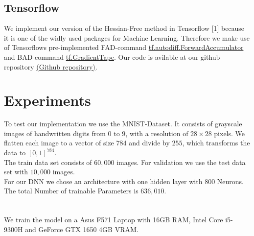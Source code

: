 \documentclass[conference]{IEEEtran}
\begin{document}
\subsection{Tensorflow}
\noindent
We implement our version of the Hessian-Free method in Tensorflow [1] because it is one of the widly used packages for Machine Learning.
Therefore we make use of Tensorflows pre-implemented FAD-command \href{https://www.tensorflow.org/api_docs/python/tf/autodiff/ForwardAccumulator}{tf.autodiff.ForwardAccumulator} and BAD-command \href{https://www.tensorflow.org/api_docs/python/tf/GradientTape}{tf.GradientTape}. Our code is avilable at our github repository \href{https://github.com/NiklasBrunn/Hessian_Free_Optimization_of_Deep_Neural_Networks}{(Github repository)}.



\section{Experiments}
\noindent
To test our implementation we use the MNIST-Dataset.
It consists of grayscale images of handwritten digits from $0$ to $9$, with a resolution of $28\times28$ pixels. We flatten each image to a vector of size $784$ and divide by $255$, which transforms the data to $[0,1]^{784}$.\\ The train data set consists of $60,000$ images. For validation we use the test data set with $10,000$ images.\\ 
For our DNN we chose an architecture with one hidden layer with $800$ Neurons. The total Number of trainable Parameters is $636,010$.\\
\\ \ \\ We train the model on a Asus F571 Laptop with 16GB RAM, Intel Core i5-9300H and GeForce GTX 1650 4GB VRAM.
\end{document}
